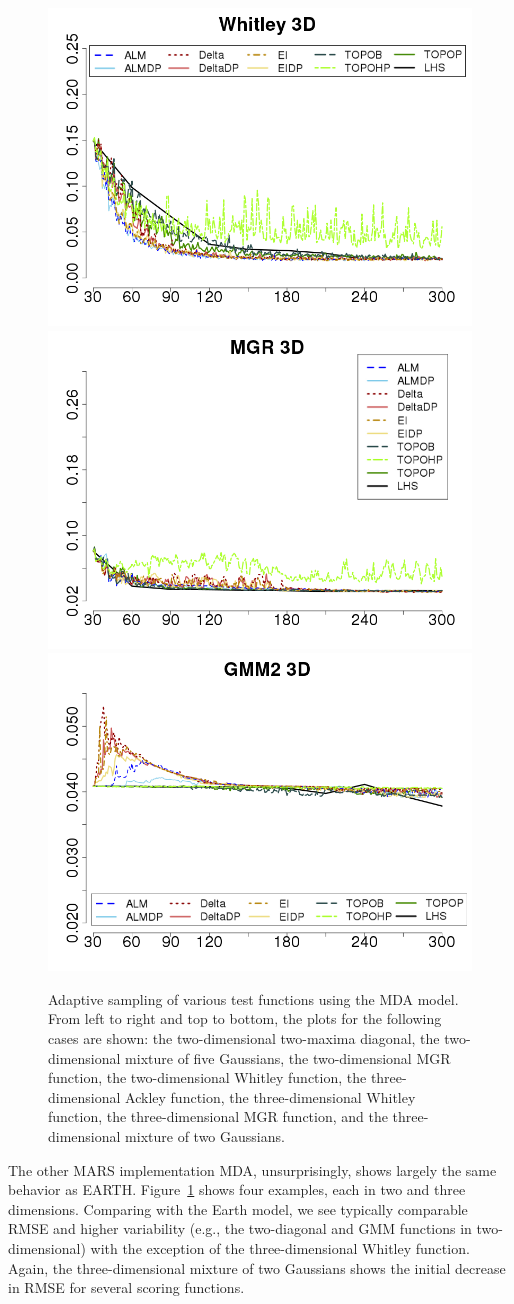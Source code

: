 \begin{figure}[t]
\begin{center}
  \includegraphics[width=0.45\linewidth]{figs/chap5/mda_Whitley_td=30}
  \includegraphics[width=0.45\linewidth]{figs/chap5/mda_MGR_td=30}
  \includegraphics[width=0.45\linewidth]{figs/chap5/mda_GMM2_3D_td=30}
\caption{Adaptive sampling of various test functions using the MDA model. From left to right and top to bottom, the plots for the following cases are shown: the two-dimensional two-maxima diagonal, the two-dimensional mixture of five Gaussians, the two-dimensional MGR function, the two-dimensional Whitley function, the three-dimensional Ackley function, the three-dimensional Whitley function, the three-dimensional MGR function, and the three-dimensional mixture of two Gaussians.}
\label{fig:mda}
\end{center}
\end{figure}

The other MARS implementation MDA, unsurprisingly, shows largely the same behavior as EARTH.
%
Figure~\ref{fig:mda} shows four examples, each in two and three dimensions.
%
Comparing with the Earth model, we see typically comparable RMSE and higher variability (e.g., the two-diagonal and GMM functions in two-dimensional) with the exception of the three-dimensional Whitley function.
%
Again, the three-dimensional mixture of two Gaussians shows the initial decrease in RMSE for several scoring functions.

